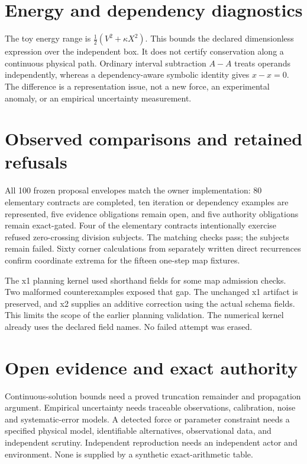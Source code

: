 \documentclass[11pt]{article}
\begin{document}
\section{Energy and dependency diagnostics}
The toy energy range is \(\tfrac12(V^2+\kappa X^2)\). This bounds the declared
dimensionless expression over the independent box. It does not certify
conservation along a continuous physical path. Ordinary interval subtraction
\(A-A\) treats operands independently, whereas a dependency-aware symbolic
identity gives \(x-x=0\). The difference is a representation issue, not a new
force, an experimental anomaly, or an empirical uncertainty measurement.

\section{Observed comparisons and retained refusals}
All 100 frozen proposal envelopes match the owner implementation: 80 elementary
contracts are completed, ten iteration or dependency examples are represented,
five evidence obligations remain open, and five authority obligations remain
exact-gated. Four of the elementary contracts intentionally exercise refused
zero-crossing division subjects. The matching checks pass; the subjects remain
failed. Sixty corner calculations from separately written direct recurrences
confirm coordinate extrema for the fifteen one-step map fixtures.

The x1 planning kernel used shorthand fields for some map admission checks.
Two malformed counterexamples exposed that gap. The unchanged x1 artifact is
preserved, and x2 supplies an additive correction using the actual schema
fields. This limits the scope of the earlier planning validation. The numerical
kernel already uses the declared field names. No failed attempt was erased.

\section{Open evidence and exact authority}
Continuous-solution bounds need a proved truncation remainder and propagation
argument. Empirical uncertainty needs traceable observations, calibration,
noise and systematic-error models. A detected force or parameter constraint
needs a specified physical model, identifiable alternatives, observational data,
and independent scrutiny. Independent reproduction needs an independent actor
and environment. None is supplied by a synthetic exact-arithmetic table.
\end{document}

